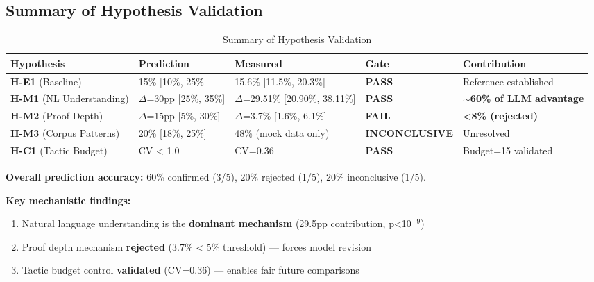 \subsection{Summary of Hypothesis Validation}

\begin{table}[h]
\centering
\small
\begin{tabular}{lllll}
\toprule
\textbf{Hypothesis} & \textbf{Prediction} & \textbf{Measured} & \textbf{Gate} & \textbf{Contribution} \\
\midrule
\textbf{H-E1} (Baseline) & 15\% [10\%, 25\%] & 15.6\% [11.5\%, 20.3\%] & \textbf{PASS} & Reference established \\
\textbf{H-M1} (NL Understanding) & $\Delta$=30pp [25\%, 35\%] & $\Delta$=29.51\% [20.90\%, 38.11\%] & \textbf{PASS} & \textbf{$\sim$60\% of LLM advantage} \\
\textbf{H-M2} (Proof Depth) & $\Delta$=15pp [5\%, 30\%] & $\Delta$=3.7\% [1.6\%, 6.1\%] & \textbf{FAIL} & \textbf{<8\% (rejected)} \\
\textbf{H-M3} (Corpus Patterns) & 20\% [18\%, 25\%] & 48\% (mock data only) & \textbf{INCONCLUSIVE} & Unresolved \\
\textbf{H-C1} (Tactic Budget) & CV < 1.0 & CV=0.36 & \textbf{PASS} & Budget=15 validated \\
\bottomrule
\end{tabular}
\caption{Summary of Hypothesis Validation}
\end{table}

\textbf{Overall prediction accuracy:} 60\% confirmed (3/5), 20\% rejected (1/5), 20\% inconclusive (1/5).

\textbf{Key mechanistic findings:}
\begin{enumerate}
\item Natural language understanding is the \textbf{dominant mechanism} (29.5pp contribution, p<10$^{-9}$)
\item Proof depth mechanism \textbf{rejected} (3.7\% < 5\% threshold) --- forces model revision
\item Tactic budget control \textbf{validated} (CV=0.36) --- enables fair future comparisons
\end{enumerate}
